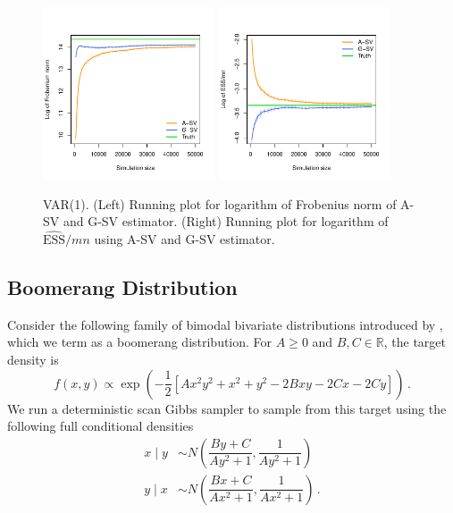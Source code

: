 \documentclass[11pt]{article}
\theoremstyle{remark}
\begin{document}
\begin{figure}[htbp]
    \centering
      \includegraphics[width = 2.0in]{plots/var-frob.pdf} 
      \includegraphics[width = 2.0in]{plots/var-ess.pdf}         
    \caption{VAR(1). (Left) Running plot for logarithm of Frobenius norm of A-SV and G-SV estimator. (Right) Running plot for logarithm of $\widehat{\textrm{ESS}}/mn$ using A-SV and G-SV estimator.}
    \label{fig:var-frob_n_ess}
\end{figure}






\subsection{Boomerang Distribution} \label{ex:boomerang}


Consider the following family of bimodal bivariate distributions introduced by \cite{gelman1991note}, which we term as a boomerang distribution. For $A \geq 0$ and $B, C  \in \mathbb{R}$, the target density is
%
\[
f(x, y) \propto \exp\left(-\dfrac{1}{2} \left[Ax^2y^2 + x^2 + y^2 -2Bxy  -2Cx - 2Cy  \right]\right)\,.
\]
We run a deterministic scan Gibbs sampler to sample from this target using the following full conditional densities
%
\begin{align*}
    x \mid y &\sim N\left(\dfrac{By + C}{Ay^2 + 1}, \dfrac{1}{Ay^2 + 1}\right)\\
    y \mid x &\sim N\left(\dfrac{Bx + C}{Ax^2 + 1}, \dfrac{1}{Ax^2 + 1}\right)\,.
\end{align*}
\end{document}
